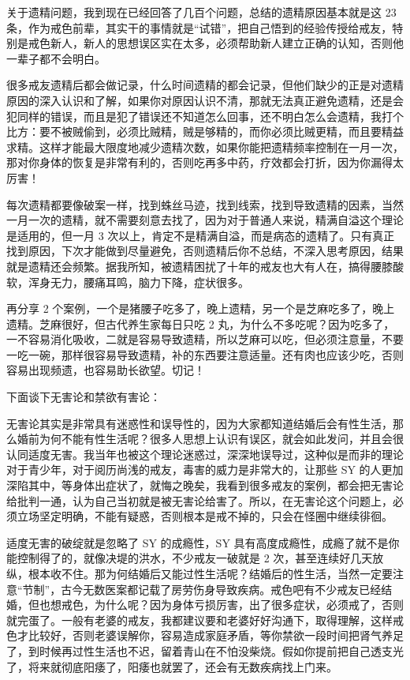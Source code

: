 \documentclass{ctexart}
\begin{document}
关于遗精问题，我到现在已经回答了几百个问题，总结的遗精原因基本就是这 23 条，作为戒色前辈，其实干的事情就是“试错”，把自己悟到的经验传授给戒友，特别是戒色新人，新人的思想误区实在太多，必须帮助新人建立正确的认知，否则他一辈子都不会明白。

很多戒友遗精后都会做记录，什么时间遗精的都会记录，但他们缺少的正是对遗精原因的深入认识和了解，如果你对原因认识不清，那就无法真正避免遗精，还是会犯同样的错误，而且是犯了错误还不知道怎么回事，还不明白怎么会遗精，我打个比方：要不被贼偷到，必须比贼精，贼是够精的，而你必须比贼更精，而且要精益求精。这样才能最大限度地减少遗精次数，如果你能把遗精频率控制在一月一次，那对你身体的恢复是非常有利的，否则吃再多中药，疗效都会打折，因为你漏得太厉害！

每次遗精都要像破案一样，找到蛛丝马迹，找到线索，找到导致遗精的因素，当然一月一次的遗精，就不需要刻意去找了，因为对于普通人来说，精满自溢这个理论是适用的，但一月 3 次以上，肯定不是精满自溢，而是病态的遗精了。只有真正找到原因，下次才能做到尽量避免，否则遗精后你不总结，不深入思考原因，结果就是遗精还会频繁。据我所知，被遗精困扰了十年的戒友也大有人在，搞得腰膝酸软，浑身无力，腰痛耳鸣，脑力下降，症状很多。

再分享 2 个案例，一个是猪腰子吃多了，晚上遗精，另一个是芝麻吃多了，晚上遗精。芝麻很好，但古代养生家每日只吃 2 丸，为什么不多吃呢？因为吃多了，一不容易消化吸收，二就是容易导致遗精，所以芝麻可以吃，但必须注意量，不要一吃一碗，那样很容易导致遗精，补的东西要注意适量。还有肉也应该少吃，否则容易出现频遗，也容易助长欲望。切记！

下面谈下无害论和禁欲有害论：

无害论其实是非常具有迷惑性和误导性的，因为大家都知道结婚后会有性生活，那么婚前为何不能有性生活呢？很多人思想上认识有误区，就会如此发问，并且会很认同适度无害。我当年也被这个理论迷惑过，深深地误导过，这种似是而非的理论对于青少年，对于阅历尚浅的戒友，毒害的威力是非常大的，让那些 SY 的人更加深陷其中，等身体出症状了，就悔之晚矣，我看到很多戒友的案例，都会把无害论给批判一通，认为自己当初就是被无害论给害了。所以，在无害论这个问题上，必须立场坚定明确，不能有疑惑，否则根本是戒不掉的，只会在怪圈中继续徘徊。

适度无害的破绽就是忽略了 SY 的成瘾性，SY 具有高度成瘾性，成瘾了就不是你能控制得了的，就像决堤的洪水，不少戒友一破就是 2 次，甚至连续好几天放纵，根本收不住。那为何结婚后又能过性生活呢？结婚后的性生活，当然一定要注意“节制”，古今无数医案都记载了房劳伤身导致疾病。戒色吧有不少戒友已经结婚，但也想戒色，为什么呢？因为身体亏损厉害，出了很多症状，必须戒了，否则就完蛋了。一般有老婆的戒友，我都建议要和老婆好好沟通下，取得理解，这样戒色才比较好，否则老婆误解你，容易造成家庭矛盾，等你禁欲一段时间把肾气养足了，到时候再过性生活也不迟，留着青山在不怕没柴烧。假如你提前把自己透支光了，将来就彻底阳痿了，阳痿也就罢了，还会有无数疾病找上门来。
\end{document}
